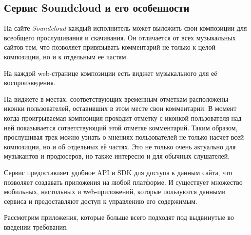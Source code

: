 \subsection{Сервис Soundcloud и его особенности}

На сайте {\itshape Soundcloud} каждый исполнитель
может выложить свои композиции для всеобщего прослушивания и
скачивания. Он отличается от всех музыкальных сайтов тем, что
позволяет привязывать комментарий не только к целой композиции, но и к
отдельным ее частям.

На каждой web-странице композиции есть виджет музыкального  для её
воспроизведения. 


На виджете в местах, соответствующих временным отметкам
расположены иконки пользователей, оставивших в этом месте
свои комментарии. В момент когда проигрываемая композиция проходит отметку
с иконкой пользователя над ней показывается сответствующий этой
отметке комментарий. Таким образом,
прослушивая трек можно узнать о мнениях пользователей не только насчет
всей композиции, но и об отдельных её частях. 
Это не только очень актуально для музыкантов и продюсеров, но также
интересно и для обычных слушателей.

Сервис предоставляет удобное API и SDK для доступа к данным сайта, что
позволяет создавать приложения на любой платформе. И существует
множество  мобильных, настольных и web-приложений, которые
пользуются данными сервиса и предоставляют доступ к управлению его содержимым.  

Рассмотрим приложения, которые больше всего подходят под выдвинутые во введении
требования.